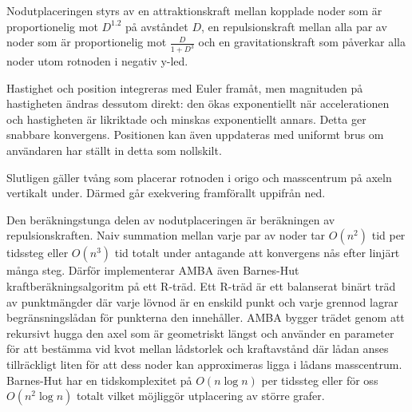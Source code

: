 Nodutplaceringen styrs av en attraktionskraft mellan kopplade noder som är
proportionelig mot $D^{1.2}$ på avståndet $D$, en repulsionskraft mellan alla
par av noder som är proportionelig mot $\frac{D}{1+D^3}$ och en
gravitationskraft som påverkar alla noder utom rotnoden i negativ y-led.

Hastighet och position integreras med Euler framåt, men magnituden på
hastigheten ändras dessutom direkt: den ökas exponentiellt när accelerationen
och hastigheten är likriktade och minskas exponentiellt annars. Detta ger
snabbare konvergens. Positionen kan även uppdateras med uniformt brus om
användaren har ställt in detta som nollskilt.

Slutligen gäller tvång som placerar rotnoden i origo och masscentrum på axeln
vertikalt under. Därmed går exekvering framförallt uppifrån ned.

Den beräkningstunga delen av nodutplaceringen är beräkningen av
repulsionskraften. Naiv summation mellan varje par av noder tar $O(n^2)$ tid per
tidssteg eller $O(n^3)$ tid totalt under antagande att konvergens nås efter
linjärt många steg. Därför implementerar AMBA även Barnes-Hut
kraftberäkningsalgoritm på ett R-träd. Ett R-träd är ett balanserat binärt träd
av punktmängder där varje lövnod är en enskild punkt och varje grennod lagrar
begränsningslådan för punkterna den innehåller. AMBA bygger trädet genom att
rekursivt hugga den axel som är geometriskt längst och använder en parameter för
att bestämma vid kvot mellan lådstorlek och kraftavstånd där lådan anses
tillräckligt liten för att dess noder kan approximeras ligga i lådans
masscentrum. Barnes-Hut har en tidskomplexitet på $O(n\log n)$ per tidssteg
eller för oss $O(n^2\log n)$ totalt vilket möjliggör utplacering av större
grafer.
